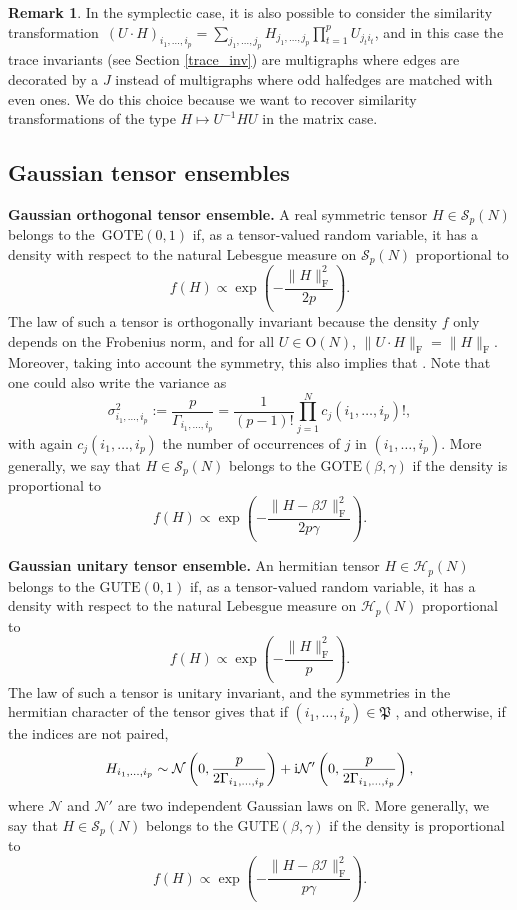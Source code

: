 \documentclass[pdftex]{sigma}
\numberwithin{equation}{section}
\theoremstyle{definition}
\newtheorem{Remark}[Theorem]{Remark}
\begin{document}
\begin{Remark}
    In the symplectic case, it is also possible to consider the similarity transformation~${(U \cdot H)_{i_1,\dots,i_p}=\sum_{j_1,\dots,j_p} H_{j_1,\dots,j_p} \prod_{t=1}^p U_{j_t i_t}}$, and in this case the trace invariants (see Section \ref{trace_inv}) are multigraphs where edges are decorated by a $J$ instead of multigraphs where odd halfedges are matched with even ones. We do this choice because we want to recover similarity transformations of the type $H \mapsto U^{-1} H U$ in the matrix case.
\end{Remark}

\subsection{Gaussian tensor ensembles}\label{GTE}

{\bf Gaussian orthogonal tensor ensemble.}
A real symmetric tensor $H \in \mathcal{S}_p(N)$ belongs to the~$\textrm{GOTE}(0,1)$ if, as a tensor-valued random variable, it has a density with respect to the natural Lebesgue measure on $\mathcal{S}_p(N)$ proportional to
\[f(H) \propto \exp{\left(- \frac{\| H \| _{\mathrm{F}}^2}{2p}\right)}.\]
The law of such a tensor is orthogonally invariant because the density $f$ only depends on the Frobenius norm, and for all $U \in \mathrm{O}(N)$, $\| U \cdot H \|_{\mathrm{F}} = \|H\|_{\mathrm{F}}$. Moreover, taking into account the symmetry, this also implies that
.
Note that one could also write the variance as
\[ \sigma_{i_1,\dots,i_p}^2:= \frac{p}{ \Gamma_{i_1,\dots,i_p} } = \frac{1}{(p-1)!}\prod_{j=1}^N c_j(i_1,\dots,i_p)!,\]
with again $c_j(i_1,\dots,i_p)$ the number of occurrences of $j$ in $(i_1,\dots,i_p)$. More generally, we say that $H \in \mathcal{S}_p(N)$ belongs to the $\textrm{GOTE}(\beta,\gamma)$ if the density is proportional to
\[f(H) \propto \exp{\left(-\frac{\| H - \beta \mathcal{I} \|_{\mathrm{F}}^2}{2p\gamma}\right)}.\]

{\bf Gaussian unitary tensor ensemble.}
An hermitian tensor $H \in \mathcal{H}_p(N)$ belongs to the $\textrm{GUTE}(0,1)$ if, as a tensor-valued random variable, it has a density with respect to the natural Lebesgue measure on $\mathcal{H}_p(N)$ proportional to
\[f(H) \propto \exp{\left(-\frac{\| H \| _{\mathrm{F}}^2}{p}\right)}.\]
The law of such a tensor is unitary invariant, and the symmetries in the hermitian character of the tensor gives that if $(i_1,\dots,i_p) \in \mathfrak{P}$
,
and otherwise, if the indices are not paired,
\[ H_{i_1,\dots,i_{p}} \sim \mathcal{N}\left(0,\frac{p}{2 \Gamma_{i_1,\dots,i_{p}}  }\right) +{\rm i} \mathcal{N}'\left(0,\frac{p}{2 \Gamma_{i_1,\dots,i_{p}} }\right), \]
where $\mathcal{N}$ and $\mathcal{N}'$ are two independent Gaussian laws on $\mathbb{R}$. More generally, we say that ${H \in \mathcal{S}_p(N)}$ belongs to the $\textrm{GUTE}(\beta,\gamma)$ if the density is proportional to
\[f(H) \propto \exp{\left(-\frac{\| H - \beta \mathcal{I} \| _{\mathrm{F}}^2}{p \gamma}\right)}.\]
\end{document}

